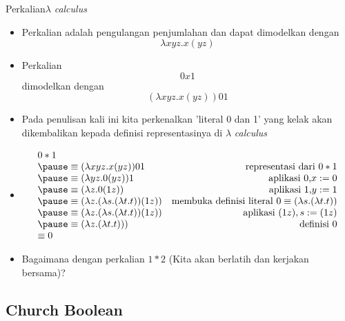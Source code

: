\documentclass[aspectratio=1610,10pt,handout]{beamer}
\newcommand{\lc}{$\lambda$ {\it calculus}\ }
\begin{document}
\begin{frame}{Perkalian}{\lc }

	\begin{itemize}
		\item<1-> Perkalian adalah pengulangan penjumlahan dan dapat dimodelkan dengan $$\lambda x y z. x (y z) $$

		\item<2-> Perkalian $$0 x 1$$ dimodelkan dengan $$ (\lambda x y z. x (y z)) 0 1 $$

		\item<2-> Pada penulisan kali ini kita perkenalkan 'literal 0 dan 1' yang kelak akan dikembalikan kepada definisi representasinya di \lc

		\item<3->
		\[
		\begin{array}{lr}
		0*1 & \\

		\pause
		\equiv  (\lambda x y z. x (y z)) 0 1  & $representasi dari $ 0*1 \\

		\pause
		\equiv  (\lambda y z. 0 (y z)) 1 & $aplikasi 0,$ x:=0 \\

		\pause
		\equiv  (\lambda z. 0 (1 z))  & $aplikasi 1,$ y:= 1 \\

		\pause
		\equiv  (\lambda z. (\lambda s. (\lambda t. t)) (1 z))  & $membuka definisi literal $ 0
		\equiv (\lambda s. (\lambda t. t)) \\
		\pause

 		\equiv  (\lambda z. (\lambda s. (\lambda t. t)) (1 z))  & $aplikasi $ (1 z), s:= (1 z) \\

 		\pause
		\equiv  (\lambda z. (\lambda t. t)))  & $definisi $ 0 \\
		\equiv  0 &  \\
		\end{array}
		\]

		\item<4-> Bagaimana dengan perkalian $1 * 2$ (Kita akan berlatih dan kerjakan bersama)?

	\end{itemize}
	\end{frame}

\subsection{Church Boolean}
\end{document}
